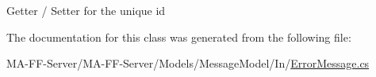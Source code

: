 Getter / Setter for the unique id 



The documentation for this class was generated from the following file\+:\begin{DoxyCompactItemize}
\item 
M\+A-\/\+F\+F-\/\+Server/\+M\+A-\/\+F\+F-\/\+Server/\+Models/\+Message\+Model/\+In/\hyperlink{_error_message_8cs}{Error\+Message.\+cs}\end{DoxyCompactItemize}
